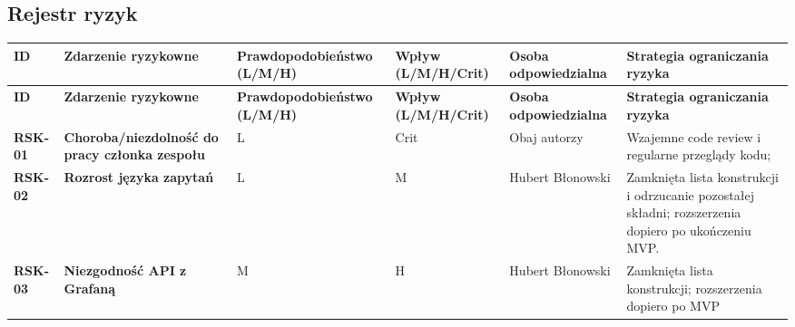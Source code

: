 \documentclass[12pt,a4paper]{article}
\begin{document}
\begin{landscape}
    \subsection{Rejestr ryzyk}
    \begingroup
    \small
    \begin{longtable}{>{\raggedright\arraybackslash}p{}>{\raggedright\arraybackslash}p{}>{\raggedright\arraybackslash}p{}>{\raggedright\arraybackslash}p{}>{\raggedright\arraybackslash}p{}>{\raggedright\arraybackslash}p{}}
        \hline
        \textbf{ID}     & \textbf{Zdarzenie ryzykowne}                          & \textbf{Prawdopodo\-bieństwo (L/M/H)} & \textbf{Wpływ (L/M/H/\allowbreak{}Crit)} & \textbf{Osoba odpowiedzialna} & \textbf{Strategia ograniczania ryzyka}                                                               \\
        \hline
        \endfirsthead
        \textbf{ID}     & \textbf{Zdarzenie ryzykowne}                          & \textbf{Prawdopodo\-bieństwo (L/M/H)} & \textbf{Wpływ (L/M/H/\allowbreak{}Crit)} & \textbf{Osoba odpowiedzialna} & \textbf{Strategia ograniczania ryzyka}                                                               \\
        \hline
        \endhead
        \textbf{RSK-01} & \textbf{Choroba/niezdolność do pracy członka zespołu} & L                                     & Crit                                     & Obaj autorzy                  & Wzajemne code review i regularne przeglądy kodu;                                                     \\
        \hline
        \textbf{RSK-02} & \textbf{Rozrost języka zapytań}                       & L                                     & M                                        & Hubert Błonowski              & Zamknięta lista konstrukcji i odrzucanie pozostałej składni; rozszerzenia dopiero po ukończeniu MVP. \\
        \hline
        \textbf{RSK-03} & \textbf{Niezgodność API z Grafaną}                    & M                                     & H                                        & Hubert Błonowski              & Zamknięta lista konstrukcji; rozszerzenia dopiero po MVP                                             \\

\end{longtable}
\end{landscape}
\end{document}
